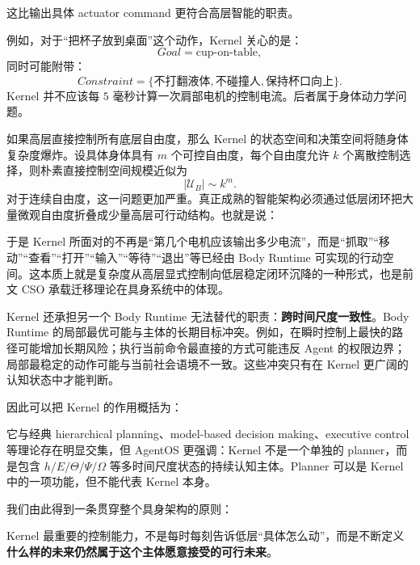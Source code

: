 这比输出具体 actuator command 更符合高层智能的职责。

例如，对于“把杯子放到桌面”这个动作，Kernel 关心的是：
\[
Goal=\text{cup-on-table},
\]
同时可能附带：
\[
Constraint=
\{\text{不打翻液体},\text{不碰撞人},\text{保持杯口向上}\}.
\]
Kernel 并不应该每 $5$ 毫秒计算一次肩部电机的控制电流。后者属于身体动力学问题。

如果高层直接控制所有底层自由度，那么 Kernel 的状态空间和决策空间将随身体复杂度爆炸。设具体身体具有 $m$ 个可控自由度，每个自由度允许 $k$ 个离散控制选择，则朴素直接控制空间规模近似为
\[
|\mathcal U_B|
\sim
k^m.
\]
对于连续自由度，这一问题更加严重。真正成熟的智能架构必须通过低层闭环把大量微观自由度折叠成少量高层可行动结构。也就是说：
\begin{statementbox}
\centering
{}
\end{statementbox}

于是 Kernel 所面对的不再是“第几个电机应该输出多少电流”，而是“抓取”“移动”“查看”“打开”“输入”“等待”“退出”等已经由 Body Runtime 可实现的行动空间。这本质上就是复杂度从高层显式控制向低层稳定闭环沉降的一种形式，也是前文 CSO 承载迁移理论在具身系统中的体现。

Kernel 还承担另一个 Body Runtime 无法替代的职责：\textbf{跨时间尺度一致性}。Body Runtime 的局部最优可能与主体的长期目标冲突。例如，在瞬时控制上最快的路径可能增加长期风险；执行当前命令最直接的方式可能违反 Agent 的权限边界；局部最稳定的动作可能与当前社会语境不一致。这些冲突只有在 Kernel 更广阔的认知状态中才能判断。

因此可以把 Kernel 的作用概括为：
\begin{statementbox}
\centering
{}
\end{statementbox}

它与经典 hierarchical planning、model-based decision making、executive control 等理论存在明显交集，但 AgentOS 更强调：Kernel 不是一个单独的 planner，而是包含 $h/E/\Theta/\Psi/\Omega$ 等多时间尺度状态的持续认知主体。Planner 可以是 Kernel 中的一项功能，但不能代表 Kernel 本身。

我们由此得到一条贯穿整个具身架构的原则：
\begin{statementbox}
\centering
{}
\end{statementbox}
Kernel 最重要的控制能力，不是每时每刻告诉低层“具体怎么动”，而是不断定义\textbf{什么样的未来仍然属于这个主体愿意接受的可行未来}。

